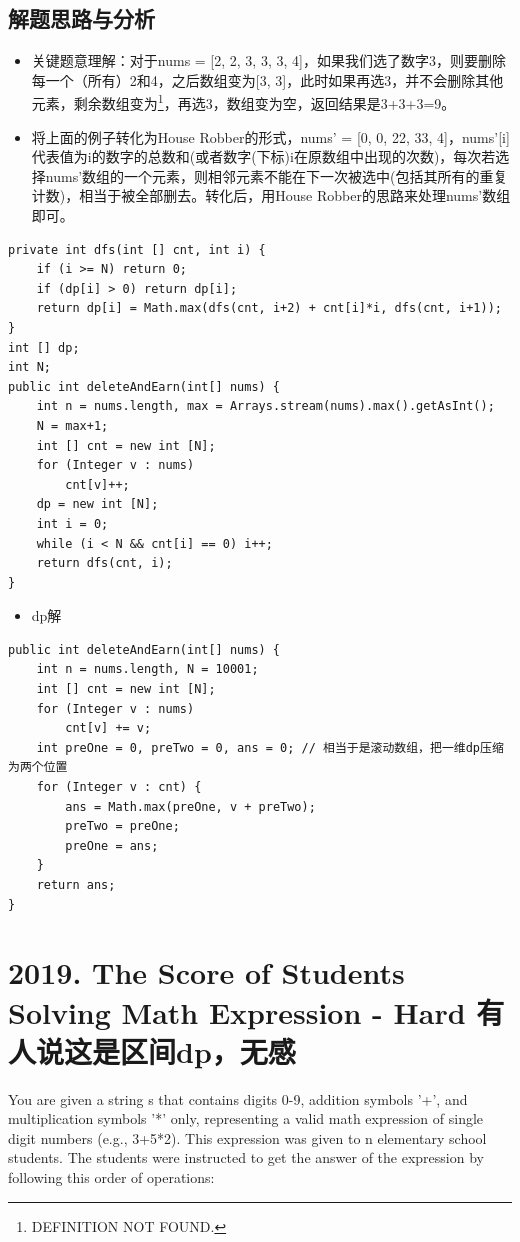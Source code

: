 \documentclass[9pt, b5paaper]{book}
\begin{document}
\subsection{解题思路与分析}
\label{sec-1-4-1}
\begin{itemize}
\item 关键题意理解：对于nums = [2, 2, 3, 3, 3, 4]，如果我们选了数字3，则要删除每一个（所有）2和4，之后数组变为[3, 3]，此时如果再选3，并不会删除其他元素，剩余数组变为\footnote{DEFINITION NOT FOUND.}，再选3，数组变为空，返回结果是3+3+3=9。
\item 将上面的例子转化为House Robber的形式，nums' = [0, 0, 22, 33, 4]，nums'[i]代表值为i的数字的总数和(或者数字(下标)i在原数组中出现的次数)，每次若选择nums'数组的一个元素，则相邻元素不能在下一次被选中(包括其所有的重复计数)，相当于被全部删去。转化后，用House Robber的思路来处理nums'数组即可。
\end{itemize}
\begin{verbatim}
private int dfs(int [] cnt, int i) {
    if (i >= N) return 0;
    if (dp[i] > 0) return dp[i];
    return dp[i] = Math.max(dfs(cnt, i+2) + cnt[i]*i, dfs(cnt, i+1));
}
int [] dp;
int N;
public int deleteAndEarn(int[] nums) {
    int n = nums.length, max = Arrays.stream(nums).max().getAsInt();
    N = max+1;
    int [] cnt = new int [N];
    for (Integer v : nums) 
        cnt[v]++;
    dp = new int [N];
    int i = 0;
    while (i < N && cnt[i] == 0) i++;
    return dfs(cnt, i);
}
\end{verbatim}
\begin{itemize}
\item dp解
\end{itemize}
\begin{verbatim}
public int deleteAndEarn(int[] nums) {
    int n = nums.length, N = 10001;
    int [] cnt = new int [N];
    for (Integer v : nums) 
        cnt[v] += v;
    int preOne = 0, preTwo = 0, ans = 0; // 相当于是滚动数组，把一维dp压缩为两个位置
    for (Integer v : cnt) {
        ans = Math.max(preOne, v + preTwo);
        preTwo = preOne;
        preOne = ans;
    }
    return ans;
}
\end{verbatim}


\section{2019. The Score of Students Solving Math Expression - Hard 有人说这是区间dp，无感}
\label{sec-1-5}
You are given a string s that contains digits 0-9, addition symbols '+', and multiplication symbols '*' only, representing a valid math expression of single digit numbers (e.g., 3+5*2). This expression was given to n elementary school students. The students were instructed to get the answer of the expression by following this order of operations:
\end{document}
